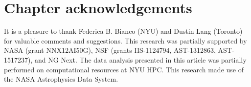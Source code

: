 \section{Chapter acknowledgements}

It is a pleasure to thank
  Federica B. Bianco (NYU)
  and
  Dustin Lang (Toronto)
for valuable comments and suggestions.
This research was partially supported by
  NASA (grant NNX12AI50G),
  NSF (grants IIS-1124794, AST-1312863, AST-1517237),
  and NG Next.
The data analysis presented in this article was partially performed on computational resources at NYU HPC.
This research made use of the NASA Astrophysics Data System.

